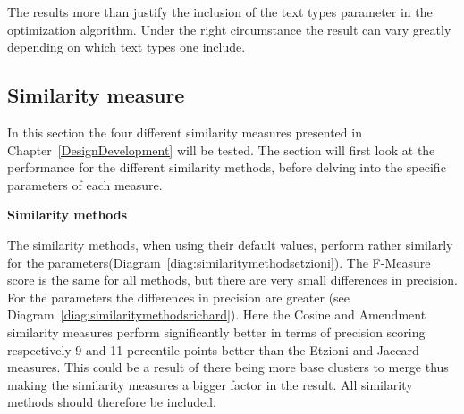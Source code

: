 The results more than justify the inclusion of the text types parameter in the optimization algorithm. Under the right circumstance the result can vary greatly depending on which text types one include.

\subsection{Similarity measure}
In this section the four different similarity measures presented in Chapter~\ref{DesignDevelopment} will be tested. The section will first look at the performance for the different similarity methods, before delving into the specific parameters of each measure.

\textbf{Similarity methods}

The similarity methods, when using their default values, perform rather similarly for the \citeauthor{Oren1998} parameters(Diagram~\ref{diag:similaritymethodsetzioni}). The F-Measure score is the same for all methods, but there are very small differences in precision. For the \citeauthor{Moe2014} parameters the differences in precision are greater (see Diagram~\ref{diag:similaritymethodsrichard}). Here the Cosine and Amendment similarity measures perform significantly better in terms of precision scoring respectively 9 and 11 percentile points better than the Etzioni and Jaccard measures. This could be a result of there being more base clusters to merge thus making the similarity measures a bigger factor in the result. All similarity methods should therefore be included.

